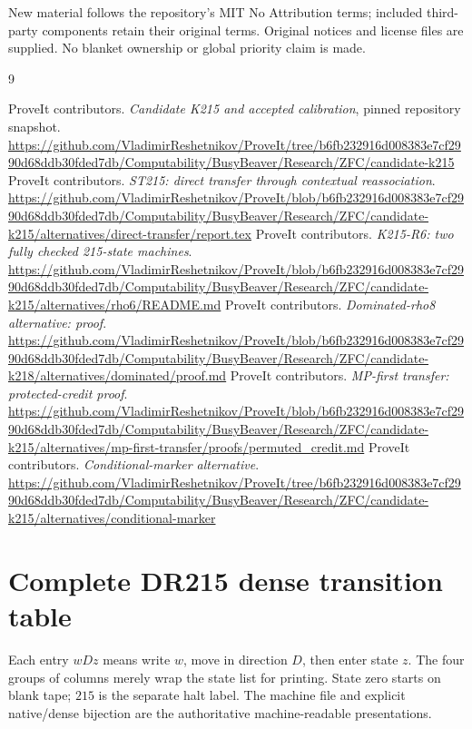 \documentclass[11pt,a4paper]{article}
\theoremstyle{definition}
\numberwithin{equation}{section}
\begin{document}
New material follows the repository's MIT No Attribution terms; included
third-party components retain their original terms. Original notices and
license files are supplied. No blanket ownership or global priority claim
is made.

\clearpage
\begin{thebibliography}{9}
\small
\raggedright
{} ProveIt contributors.
\emph{Candidate K215 and accepted calibration}, pinned repository snapshot.
\url{https://github.com/VladimirReshetnikov/ProveIt/tree/b6fb232916d008383e7cf2990d68ddb30fded7db/Computability/BusyBeaver/Research/ZFC/candidate-k215}
 ProveIt contributors.
\emph{ST215: direct transfer through contextual reassociation}.
\url{https://github.com/VladimirReshetnikov/ProveIt/blob/b6fb232916d008383e7cf2990d68ddb30fded7db/Computability/BusyBeaver/Research/ZFC/candidate-k215/alternatives/direct-transfer/report.tex}
 ProveIt contributors.
\emph{K215-R6: two fully checked 215-state machines}.
\url{https://github.com/VladimirReshetnikov/ProveIt/blob/b6fb232916d008383e7cf2990d68ddb30fded7db/Computability/BusyBeaver/Research/ZFC/candidate-k215/alternatives/rho6/README.md}
 ProveIt contributors.
\emph{Dominated-rho8 alternative: proof}.
\url{https://github.com/VladimirReshetnikov/ProveIt/blob/b6fb232916d008383e7cf2990d68ddb30fded7db/Computability/BusyBeaver/Research/ZFC/candidate-k218/alternatives/dominated/proof.md}
 ProveIt contributors.
\emph{MP-first transfer: protected-credit proof}.
\url{https://github.com/VladimirReshetnikov/ProveIt/blob/b6fb232916d008383e7cf2990d68ddb30fded7db/Computability/BusyBeaver/Research/ZFC/candidate-k215/alternatives/mp-first-transfer/proofs/permuted_credit.md}
 ProveIt contributors.
\emph{Conditional-marker alternative}.
\url{https://github.com/VladimirReshetnikov/ProveIt/tree/b6fb232916d008383e7cf2990d68ddb30fded7db/Computability/BusyBeaver/Research/ZFC/candidate-k215/alternatives/conditional-marker}
\end{thebibliography}

\clearpage
\appendix
\section{Complete DR215 dense transition table}
\label{sec:table}

Each entry $wDz$ means write $w$, move in direction $D$, then enter
state $z$. The four groups of columns merely wrap the state list for
printing. State zero starts on blank tape; $215$ is the separate halt
label. The machine file and explicit native/dense bijection are the
authoritative machine-readable presentations.


\end{document}
